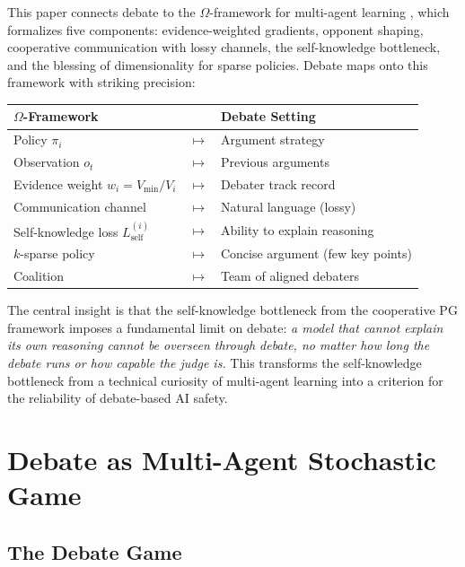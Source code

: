 \documentclass[11pt,a4paper]{article}
\newcommand{\Lself}{L_{\text{self}}}
\begin{document}
This paper connects debate to the $\Omega$-framework for multi-agent
learning \cite{shcherbinin2026ewpg,shcherbinin2026coop,shcherbinin2026bless},
which formalizes five components: evidence-weighted gradients, opponent
shaping, cooperative communication with lossy channels, the self-knowledge
bottleneck, and the blessing of dimensionality for sparse policies. Debate
maps onto this framework with striking precision:

\begin{center}
\begin{tabular}{lll}
\textbf{$\Omega$-Framework} & & \textbf{Debate Setting} \\
\hline
Policy $\pi_i$ & $\mapsto$ & Argument strategy \\
Observation $o_t$ & $\mapsto$ & Previous arguments \\
Evidence weight $w_i = V_{\min}/V_i$ & $\mapsto$ & Debater track record \\
Communication channel & $\mapsto$ & Natural language (lossy) \\
Self-knowledge loss $\Lself^{(i)}$ & $\mapsto$ & Ability to explain reasoning \\
$k$-sparse policy & $\mapsto$ & Concise argument (few key points) \\
Coalition & $\mapsto$ & Team of aligned debaters \\
\end{tabular}
\end{center}

The central insight is that the self-knowledge bottleneck from the
cooperative PG framework \cite{shcherbinin2026coop} imposes a fundamental
limit on debate: \emph{a model that cannot explain its own reasoning cannot
be overseen through debate, no matter how long the debate runs or how
capable the judge is.} This transforms the self-knowledge bottleneck
from a technical curiosity of multi-agent learning into a criterion for
the reliability of debate-based AI safety.


\section{Debate as Multi-Agent Stochastic Game}
\label{sec:debate-game}

\subsection{The Debate Game}
\end{document}
